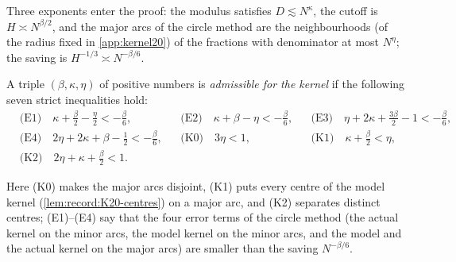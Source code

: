 Three exponents enter the proof: the modulus satisfies $D\lesssim N^\kappa$,
the cutoff is $H\asymp N^{\beta/2}$, and the major arcs of the circle method
are the neighbourhoods (of the radius fixed in \cref{app:kernel20}) of the
fractions with denominator at most $N^\eta$; the
saving is $H^{-1/3}\asymp N^{-\beta/6}$.

\begin{definition}\label{def:kernel-conditions}
A triple $(\beta,\kappa,\eta)$ of positive numbers is \emph{admissible for the
kernel} if the following seven strict inequalities hold:
\begin{align*}
 &\text{(E1)}\quad \kappa+\tfrac\beta2-\tfrac\eta2<-\tfrac\beta6, &
 &\text{(E2)}\quad \kappa+\beta-\eta<-\tfrac\beta6, &
 &\text{(E3)}\quad \eta+2\kappa+\tfrac{3\beta}2-1<-\tfrac\beta6,\\
 &\text{(E4)}\quad 2\eta+2\kappa+\beta-\tfrac12<-\tfrac\beta6, &
 &\text{(K0)}\quad 3\eta<1, &
 &\text{(K1)}\quad \kappa+\tfrac\beta2<\eta,\\
 &\text{(K2)}\quad 2\eta+\kappa+\tfrac\beta2<1 .
\end{align*}
\end{definition}

Here (K0) makes the major arcs disjoint, (K1) puts every centre of the model
kernel (\cref{lem:record:K20-centres}) on a major arc, and (K2) separates
distinct centres; (E1)--(E4) say that the
four error terms of the circle method (the actual kernel on the minor arcs, the
model kernel on the minor arcs, and the model and the actual kernel on the
major arcs) are smaller than the saving $N^{-\beta/6}$.

